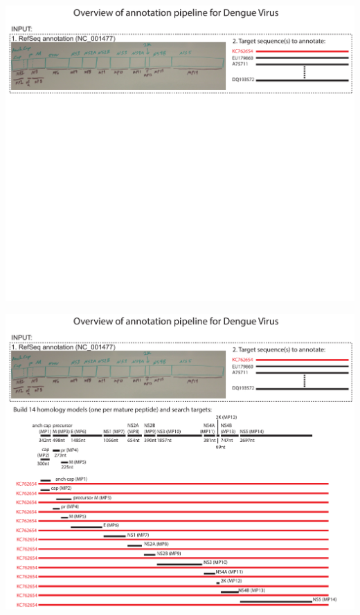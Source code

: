 \documentclass[landscape]{slides}
\begin{document}
\begin{slide}
\begin{center}
\includegraphics[width=10in]{figs/annotation-schematic-dengue-1}
\end{center}
\vfill
\end{slide}
\begin{slide}
\begin{center}
\includegraphics[width=10in]{figs/annotation-schematic-dengue-2}
\end{center}
\vfill
\end{slide}
\end{document}
